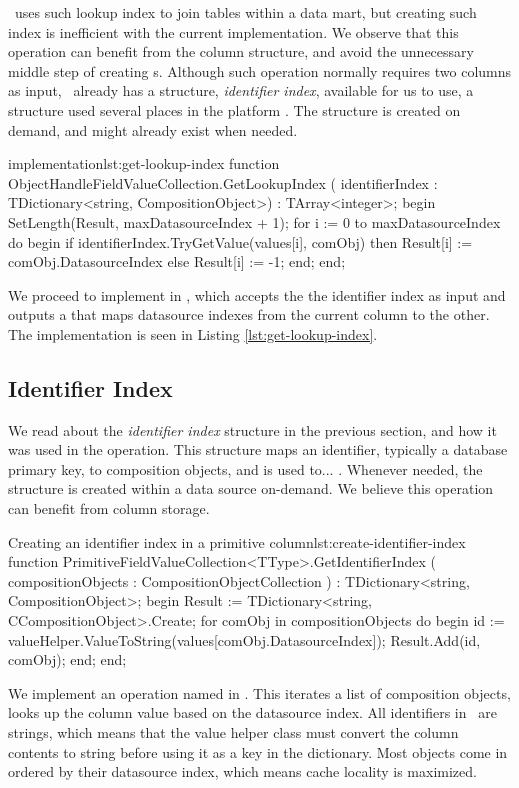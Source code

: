 \gd~uses such lookup index to join tables within a data mart, but creating such index is inefficient with the current implementation. We observe that this operation can benefit from the column structure, and avoid the unnecessary middle step of creating s. Although such operation normally requires two columns as input, \gap~already has a structure, \textit{identifier index}, available for us to use, a structure used several places in the platform . The structure is created on demand, and might already exist when needed.

\begin{delphicode}{ implementation}{lst:get-lookup-index}
function ObjectHandleFieldValueCollection.GetLookupIndex
( identifierIndex : TDictionary<string, CompositionObject>)
: TArray<integer>;
begin
  SetLength(Result, maxDatasourceIndex + 1);
  for i := 0 to maxDatasourceIndex do
  begin
    if identifierIndex.TryGetValue(values[i], comObj) then
      Result[i] := comObj.DatasourceIndex
    else
      Result[i] := -1;
  end;
end;
\end{delphicode}
We proceed to implement  in , which accepts the the identifier index as input and outputs a  that maps datasource indexes from the current column to the other. The implementation is seen in Listing \ref{lst:get-lookup-index}.  

\subsection{Identifier Index}
\label{sub:Identifier Index}
We read about the \textit{identifier index} structure in the previous section, and how it was used in the  operation. This structure maps an identifier, typically a database primary key, to composition objects, and is used to... . Whenever needed, the structure is created within a data source on-demand. We believe this operation can benefit from column storage.

\begin{delphicode}{Creating an identifier index in a primitive column}{lst:create-identifier-index}
function PrimitiveFieldValueCollection<TType>.GetIdentifierIndex
( compositionObjects : CompositionObjectCollection )
: TDictionary<string, CompositionObject>;
begin
  Result := TDictionary<string, CCompositionObject>.Create;
  for comObj in compositionObjects do
  begin
    id := valueHelper.ValueToString(values[comObj.DatasourceIndex]);
    Result.Add(id, comObj);
  end;
end;
\end{delphicode}
We implement an operation named  in . This iterates a list of composition objects, looks up the column value based on the datasource index. All identifiers in \gap~are strings, which means that the value helper class must convert the column contents to string before using it as a key in the dictionary. Most objects come in ordered by their datasource index, which means cache locality is maximized.

